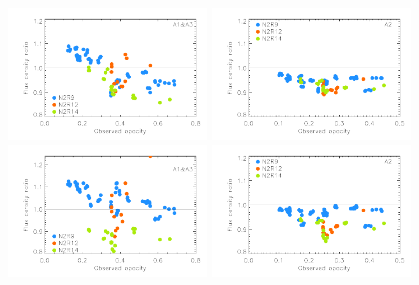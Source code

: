 \begin{figure}[ht!]
  \begin{center}
    \includegraphics[clip=true,width=0.47\textwidth]{Figures/Calibration/Photocorr/plot_flux_density_ratio_MWC349_obstau_secondary_photocorr_demo_1mm.pdf}
    \includegraphics[clip=true,width=0.47\textwidth]{Figures/Calibration/Photocorr/plot_flux_density_ratio_MWC349_obstau_secondary_photocorr_demo_a2.pdf}
    \includegraphics[clip=true,width=0.47\textwidth]{Figures/Calibration/Photocorr/plot_flux_density_ratio_MWC349_obstau_secondary_photocorr_pointing_1mm.pdf}
    \includegraphics[clip=true,width=0.47\textwidth]{Figures/Calibration/Photocorr/plot_flux_density_ratio_MWC349_obstau_secondary_photocorr_pointing_a2.pdf}
    

\end{center}
\end{figure}
